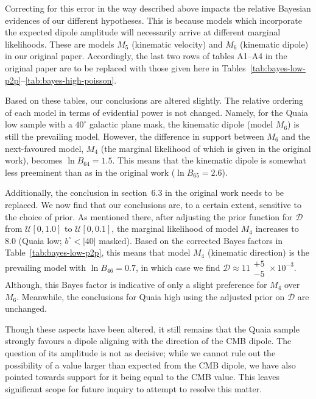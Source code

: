 \documentclass[fleqn,usenatbib]{mnras}
\begin{document}
Correcting for this error in the way described above impacts the relative Bayesian evidences
of our different hypotheses.
This is because models which incorporate the expected dipole amplitude will
necessarily arrive at different marginal likelihoods.
These are models $M_5$ (kinematic velocity) and $M_6$ (kinematic dipole)
in our original paper.
Accordingly,
the last two rows of tables A1--A4 in the original paper
are to be replaced with those given here in
Tables~\ref{tab:bayes-low-p2p}--\ref{tab:bayes-high-poisson}.

Based on these tables, our conclusions are altered slightly.
The relative ordering of each model in terms of evidential power is not changed.
Namely,
for the Quaia low sample with a $40^\circ$ galactic plane mask,
the kinematic dipole (model $M_6$) is still the prevailing model.
However, the difference in support between $M_6$ and the next-favoured model,
$M_4$ (the marginal likelihood of which is given in the original work),
becomes $\ln B_{64} = 1.5$.
This means that the kinematic dipole is somewhat less preeminent than as in the original work
($\ln B_{65} = 2.6$).

Additionally, the conclusion in section~6.3 in the original work
needs to be replaced.
We now find that our conclusions are, to a certain extent,
sensitive to the choice of prior.
As mentioned there,
after adjusting the prior function for $\mathcal{D}$
from $\mathcal{U}[0,1.0]$ to $\mathcal{U}[0,0.1]$,
the marginal likelihood of model $M_4$ increases to 8.0
(Quaia low; $b^\circ < |40|$ masked).
Based on the corrected Bayes factors in Table~\ref{tab:bayes-low-p2p},
this means that model $M_4$ (kinematic direction) is the prevailing model
with $\ln B_{46} = 0.7$,
in which case we find $\mathcal{D} \approx 11\substack{+5 \\ -5} \times 10^{-3}$.
Although, this Bayes factor is indicative of only a slight preference
for $M_4$ over $M_6$.
Meanwhile,
the conclusions for Quaia high using the adjusted prior on $\mathcal{D}$
are unchanged.

Though these aspects have been altered,
it still remains that the Quaia sample
strongly favours a dipole aligning with the direction
of the CMB dipole.
The question of its amplitude is not as decisive;
while we cannot rule out the possibility of a value
larger than expected from the CMB dipole,
we have also pointed towards support for
it being equal to the CMB value.
This leaves significant scope for future inquiry
to attempt to resolve this matter.

\end{document}
